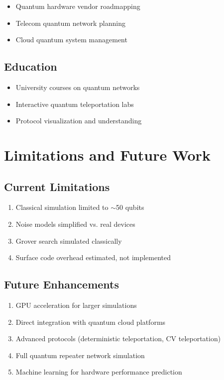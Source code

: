 \documentclass[11pt,a4paper]{article}
\begin{document}
\begin{itemize}
    \item Quantum hardware vendor roadmapping
    \item Telecom quantum network planning
    \item Cloud quantum system management
\end{itemize}

\subsection{Education}

\begin{itemize}
    \item University courses on quantum networks
    \item Interactive quantum teleportation labs
    \item Protocol visualization and understanding
\end{itemize}

\section{Limitations and Future Work}

\subsection{Current Limitations}

\begin{enumerate}
    \item Classical simulation limited to $\sim$50 qubits
    \item Noise models simplified vs. real devices
    \item Grover search simulated classically
    \item Surface code overhead estimated, not implemented
\end{enumerate}

\subsection{Future Enhancements}

\begin{enumerate}
    \item GPU acceleration for larger simulations
    \item Direct integration with quantum cloud platforms
    \item Advanced protocols (deterministic teleportation, CV teleportation)
    \item Full quantum repeater network simulation
    \item Machine learning for hardware performance prediction
\end{enumerate}
\end{document}
